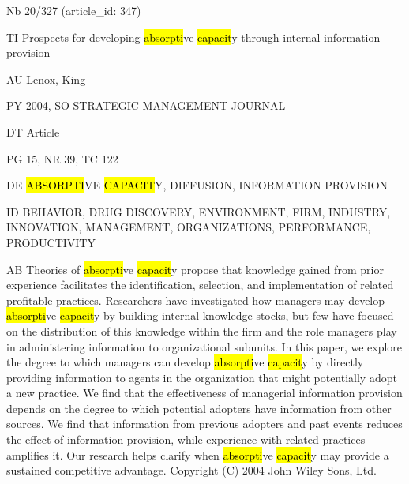 \documentclass[a4paper]{article}
\begin{document}
\vspace*{-2cm}
Nb \tabto{0cm}20/327 (article\_id: 347)\par
TI \tabto{0cm}Prospects for developing \hl{absorpti}ve \hl{capacit}y through internal information provision\par
AU \tabto{0cm}Lenox, King\par
PY \tabto{0cm}2004, SO STRATEGIC MANAGEMENT JOURNAL\par
DT \tabto{0cm}Article\par
PG \tabto{0cm}15, NR 39, TC 122\par
DE \tabto{0cm}\hl{ABSORPTI}VE \hl{CAPACIT}Y, DIFFUSION, INFORMATION PROVISION\par
ID \tabto{0cm}BEHAVIOR, DRUG DISCOVERY, ENVIRONMENT, FIRM, INDUSTRY, INNOVATION, MANAGEMENT, ORGANIZATIONS, PERFORMANCE, PRODUCTIVITY\par
AB \tabto{0cm}Theories of \hl{absorpti}ve \hl{capacit}y propose that knowledge gained from prior experience facilitates the identification, selection, and implementation of related profitable practices. Researchers have investigated how managers may develop \hl{absorpti}ve \hl{capacit}y by building internal knowledge stocks, but few have focused on the distribution of this knowledge within the firm and the role managers play in administering information to organizational subunits. In this paper, we explore the degree to which managers can develop \hl{absorpti}ve \hl{capacit}y by directly providing information to agents in the organization that might potentially adopt a new practice. We find that the effectiveness of managerial information provision depends on the degree to which potential adopters have information from other sources. We find that information from previous adopters and past events reduces the effect of information provision, while experience with related practices amplifies it. Our research helps clarify when \hl{absorpti}ve \hl{capacit}y may provide a sustained competitive advantage. Copyright (C) 2004 John Wiley Sons, Ltd.\par
\clearpage
\end{document}
